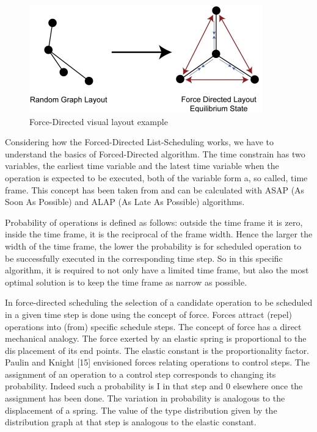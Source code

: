 \documentclass[conference]{IEEEtran}
\begin{document}
\begin{figure}[htbp]
\centerline{\includegraphics[scale=.5]{force_directed_layout_example.png}}
\caption{Force-Directed visual layout example}
\label{fdlayout}
\end{figure}

Considering how the Forced-Directed List-Scheduling works, we have to understand the basics of Forced-Directed algorithm. The time constrain has two variables, the earliest time variable and the latest time variable when the operation is expected to be executed, both of the variable form a, so called, time frame. This concept has been taken from and can be calculated with ASAP (As Soon As Possible) and ALAP (As Late As Possible) algorithms.

Probability of operations is defined as follows: outside the time frame it is zero, inside the time frame, it is the reciprocal of the frame width. Hence the larger the width of the time frame, the lower the probability is for scheduled operation to be successfully executed in the corresponding time step. So in this specific algorithm, it is required to not only have a limited time frame, but also the most optimal solution is to keep the time frame as narrow as possible.

In force-directed scheduling the selection of a candidate operation to be scheduled in a given time step is done using the concept of force. Forces attract (repel) operations into (from) specific schedule steps. The concept of force has a direct mechanical analogy. The force exerted by an elastic spring is proportional to the displacement of its end points. The elastic constant is the proportionality factor. Paulin and Knight [15] envisioned forces relating operations to control steps. The assignment of an operation to a control step corresponds to changing its probability. Indeed such a probability is I in that step and 0 elsewhere once the assignment has been done. The variation in probability is analogous to the displacement of a spring. The value of the type distribution given by the distribution graph at that step is analogous to the elastic constant.
\end{document}
